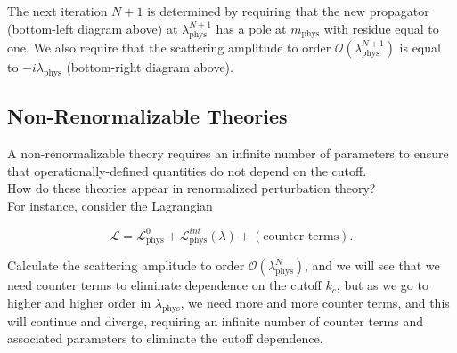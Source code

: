 \noindent The next iteration $N+1$ is determined by requiring that the new propagator (bottom-left diagram above) at $\lambda_{\text{phys}}^{N+1}$ has a pole at $m_{\text{phys}}$ with residue equal to one. We also require that the scattering amplitude to order $\mathcal{O} (\lambda_{\text{phys}}^{N+1})$ is equal to $-i \lambda_{\text{phys}}$ (bottom-right diagram above). \\

\subsection*{Non-Renormalizable Theories}

\noindent A non-renormalizable theory requires an infinite number of parameters to ensure that operationally-defined quantities do not depend on the cutoff. \\

\noindent How do these theories appear in renormalized perturbation theory? \\

\noindent For instance, consider the Lagrangian

\begin{equation}
\mathcal{L} = \mathcal{L}^0_{\text{phys}} + \mathcal{L}^{int}_{\text{phys}} (\lambda) + (\text{counter terms}) .
\end{equation}

\noindent Calculate the scattering amplitude to order $\mathcal{O} (\lambda_{\text{phys}}^{N})$, and we will see that we need counter terms to eliminate dependence on the cutoff $k_c$, but as we go to higher and higher order in $\lambda_{\text{phys}}$, we need more and more counter terms, and this will continue and diverge, requiring an infinite number of counter terms and associated parameters to eliminate the cutoff dependence.